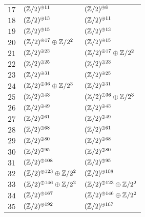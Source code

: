 \begin{supertabular}{|c|p{5.5cm}|p{5.5cm}|}
$17$%
&$(\mathbb{Z}/2)^{\oplus11}$%
&$(\mathbb{Z}/2)^{\oplus8}$\\

$18$%
&$(\mathbb{Z}/2)^{\oplus13}$%
&$(\mathbb{Z}/2)^{\oplus11}$\\

$19$%
&$(\mathbb{Z}/2)^{\oplus15}$%
&$(\mathbb{Z}/2)^{\oplus13}$\\

$20$%
&$(\mathbb{Z}/2)^{\oplus17}\oplus\mathbb{Z}/2^{2}$%
&$(\mathbb{Z}/2)^{\oplus15}$\\

$21$%
&$(\mathbb{Z}/2)^{\oplus23}$%
&$(\mathbb{Z}/2)^{\oplus17}\oplus\mathbb{Z}/2^{2}$\\

$22$%
&$(\mathbb{Z}/2)^{\oplus25}$%
&$(\mathbb{Z}/2)^{\oplus23}$\\

$23$%
&$(\mathbb{Z}/2)^{\oplus31}$%
&$(\mathbb{Z}/2)^{\oplus25}$\\

$24$%
&$(\mathbb{Z}/2)^{\oplus36}\oplus\mathbb{Z}/2^{3}$%
&$(\mathbb{Z}/2)^{\oplus31}$\\

$25$%
&$(\mathbb{Z}/2)^{\oplus43}$%
&$(\mathbb{Z}/2)^{\oplus36}\oplus\mathbb{Z}/2^{3}$\\

$26$%
&$(\mathbb{Z}/2)^{\oplus49}$%
&$(\mathbb{Z}/2)^{\oplus43}$\\

$27$%
&$(\mathbb{Z}/2)^{\oplus61}$%
&$(\mathbb{Z}/2)^{\oplus49}$\\

$28$%
&$(\mathbb{Z}/2)^{\oplus68}$%
&$(\mathbb{Z}/2)^{\oplus61}$\\

$29$%
&$(\mathbb{Z}/2)^{\oplus80}$%
&$(\mathbb{Z}/2)^{\oplus68}$\\

$30$%
&$(\mathbb{Z}/2)^{\oplus95}$%
&$(\mathbb{Z}/2)^{\oplus80}$\\

$31$%
&$(\mathbb{Z}/2)^{\oplus108}$%
&$(\mathbb{Z}/2)^{\oplus95}$\\

$32$%
&$(\mathbb{Z}/2)^{\oplus123}\oplus\mathbb{Z}/2^{2}$%
&$(\mathbb{Z}/2)^{\oplus108}$\\

$33$%
&$(\mathbb{Z}/2)^{\oplus146}\oplus\mathbb{Z}/2^{2}$%
&$(\mathbb{Z}/2)^{\oplus123}\oplus\mathbb{Z}/2^{2}$\\

$34$%
&$(\mathbb{Z}/2)^{\oplus167}$%
&$(\mathbb{Z}/2)^{\oplus146}\oplus\mathbb{Z}/2^{2}$\\

$35$%
&$(\mathbb{Z}/2)^{\oplus192}$%
&$(\mathbb{Z}/2)^{\oplus167}$\\


\end{supertabular}
